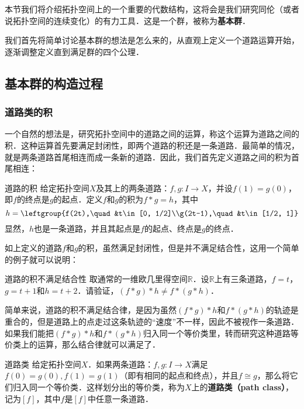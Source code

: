 
本节我们将介绍拓扑空间上的一个重要的代数结构，这将会是我们研究同伦（或者说拓扑空间的连续变化）的有力工具．这是一个群，被称为\textbf{基本群}．

我们首先将简单讨论基本群的想法是怎么来的，从直观上定义一个道路运算开始，逐渐调整定义直到满足群的四个公理．

\subsection{基本群的构造过程}
\subsubsection{道路类的积}

一个自然的想法是，研究拓扑空间中的道路之间的运算，称这个运算为道路之间的积．这种运算首先要满足封闭性，即两个道路的积还是一条道路．最简单的情况，就是两条道路首尾相连而成一条新的道路．因此，我们首先定义道路之间的积为首尾相连：

\begin{definition}{道路的积}
给定拓扑空间$X$及其上的两条道路：$f, g:I\rightarrow X$，并设$f(1)=g(0)$，即$f$的终点是$g$的起点．定义$f$和$g$的积为$f*g=h$，其中\begin{equation}h=\leftgroup{f(2t),\quad &t\in[0, 1/2]\\g(2t-1),\quad &t\in[1/2, 1]}\end{equation}
显然，$h$也是一条道路，并且其起点是$f$的起点、终点是$g$的终点．
\end{definition}

如上定义的道路$f$和$g$的积，虽然满足封闭性，但是并不满足结合性，这用一个简单的例子就可以说明：

\begin{exercise}{道路的积不满足结合性}
取通常的一维欧几里得空间$\mathbb{R}$．设$\mathbb{R}$上有三条道路，$f=t$，$g=t+1$和$h=t+2$．请验证，$(f*g)*h\not=f*(g*h)$．
\end{exercise}

简单来说，道路的积不满足结合律，是因为虽然$(f*g)*h$和$f*(g*h)$的轨迹是重合的，但是道路上的点走过这条轨迹的“速度”不一样，因此不被视作一条道路．如果我们能把$(f*g)*h$和$f*(g*h)$归入同一个等价类里，转而研究这种道路等价类上的运算，那么结合律就可以满足了．

\begin{definition}{道路类}
给定拓扑空间$X$．如果两条道路：$f, g:I\rightarrow X$满足$f(0)=g(0), f(1)=g(1)$（即有相同的起点和终点），并且$f\cong g$，那么将它们归入同一个等价类．这样划分出的等价类，称为$X$上的\textbf{道路类（path class）}，记为$[f]$，其中$f$是$[f]$中任意一条道路．
\end{definition}

